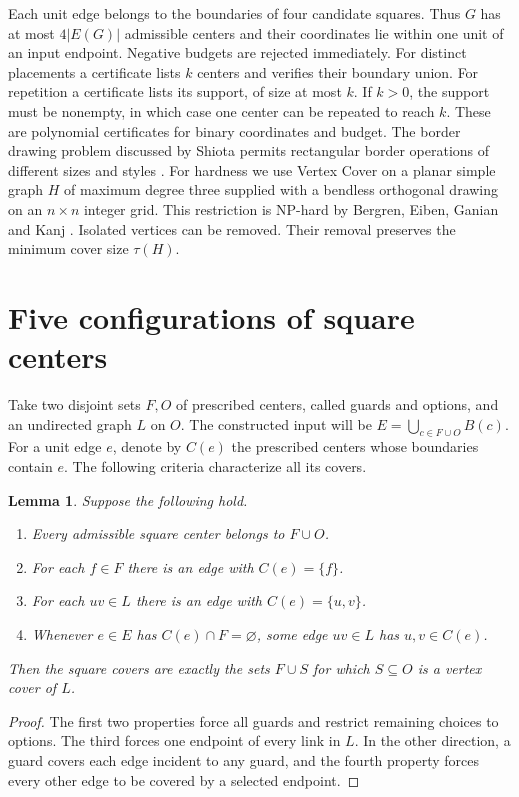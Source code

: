 \documentclass[11pt]{article}
\newtheorem{lemma}[theorem]{Lemma}
\begin{document}
Each unit edge belongs to the boundaries of four candidate squares. Thus \(G\) has at most \(4|E(G)|\) admissible centers and their coordinates lie within one unit of an input endpoint. Negative budgets are rejected immediately. For distinct placements a certificate lists \(k\) centers and verifies their boundary union. For repetition a certificate lists its support, of size at most \(k\). If \(k>0\), the support must be nonempty, in which case one center can be repeated to reach \(k\). These are polynomial certificates for binary coordinates and budget. The border drawing problem discussed by Shiota permits rectangular border operations of different sizes and styles \cite{border}. For hardness we use Vertex Cover on a planar simple graph \(H\) of maximum degree three supplied with a bendless orthogonal drawing on an \(n\times n\) integer grid. This restriction is NP-hard by Bergren, Eiben, Ganian and Kanj \cite[Theorem 4.3]{bergren}. Isolated vertices can be removed. Their removal preserves the minimum cover size \(\tau(H)\).

\section{Five configurations of square centers}
Take two disjoint sets \(F,O\) of prescribed centers, called guards and options, and an undirected graph \(L\) on \(O\). The constructed input will be \(E=\bigcup_{c\in F\cup O}B(c)\). For a unit edge \(e\), denote by \(C(e)\) the prescribed centers whose boundaries contain \(e\). The following criteria characterize all its covers.

\begin{lemma}\label{lem:local}
Suppose the following hold.
\begin{enumerate}
\item Every admissible square center belongs to \(F\cup O\).
\item For each \(f\in F\) there is an edge with \(C(e)=\{f\}\).
\item For each \(uv\in L\) there is an edge with \(C(e)=\{u,v\}\).
\item Whenever \(e\in E\) has \(C(e)\cap F=\varnothing\), some edge \(uv\in L\) has \(u,v\in C(e)\).
\end{enumerate}
Then the square covers are exactly the sets \(F\cup S\) for which \(S\subseteq O\) is a vertex cover of \(L\).
\end{lemma}
\begin{proof}
The first two properties force all guards and restrict remaining choices to options. The third forces one endpoint of every link in \(L\). In the other direction, a guard covers each edge incident to any guard, and the fourth property forces every other edge to be covered by a selected endpoint.
\end{proof}
\end{document}

